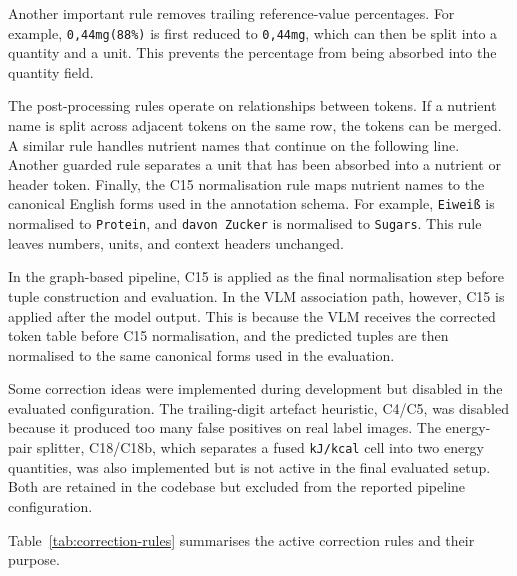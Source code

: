 Another important rule removes trailing reference-value percentages. For example, \texttt{0,44mg(88\%)} is first reduced to \texttt{0,44mg}, which can then be split into a quantity and a unit. This prevents the percentage from being absorbed into the quantity field.

The post-processing rules operate on relationships between tokens. If a nutrient name is split across adjacent tokens on the same row, the tokens can be merged. A similar rule handles nutrient names that continue on the following line. Another guarded rule separates a unit that has been absorbed into a nutrient or header token. Finally, the C15 normalisation rule maps nutrient names to the canonical English forms used in the annotation schema. For example, \texttt{Eiwei{\ss}} is normalised to \texttt{Protein}, and \texttt{davon Zucker} is normalised to \texttt{Sugars}. This rule leaves numbers, units, and context headers unchanged.

In the graph-based pipeline, C15 is applied as the final normalisation step before tuple construction and evaluation. In the VLM association path, however, C15 is applied after the model output. This is because the VLM receives the corrected token table before C15 normalisation, and the predicted tuples are then normalised to the same canonical forms used in the evaluation.

Some correction ideas were implemented during development but disabled in the evaluated configuration. The trailing-digit artefact heuristic, C4/C5, was disabled because it produced too many false positives on real label images. The energy-pair splitter, C18/C18b, which separates a fused \texttt{kJ/kcal} cell into two energy quantities, was also implemented but is not active in the final evaluated setup. Both are retained in the codebase but excluded from the reported pipeline configuration.

Table~\ref{tab:correction-rules} summarises the active correction rules and their purpose.

